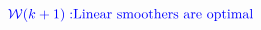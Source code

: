 \documentclass[10pt]{article}
\begin{document}
\[\textcolor{blue}{\mathcal{W}(k+1):}\\
\textcolor{blue}{\text{Linear smoothers are optimal}}\\
\]
\end{document}
